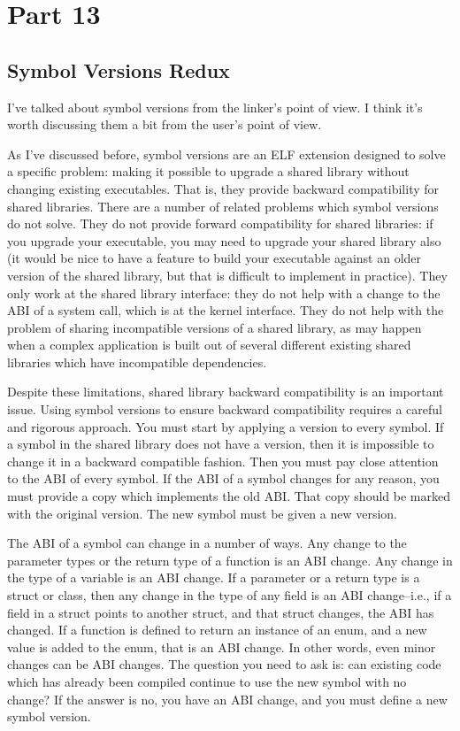 \section{Part 13}

\subsection{Symbol Versions Redux}

I've talked about symbol versions from the linker's point of view. I think it's
worth discussing them a bit from the user's point of view.

As I've discussed before, symbol versions are an ELF extension designed to
solve a specific problem: making it possible to upgrade a shared library
without changing existing executables. That is, they provide backward
compatibility for shared libraries. There are a number of related problems
which symbol versions do not solve. They do not provide forward compatibility
for shared libraries: if you upgrade your executable, you may need to upgrade
your shared library also (it would be nice to have a feature to build your
executable against an older version of the shared library, but that is
difficult to implement in practice). They only work at the shared library
interface: they do not help with a change to the ABI of a system call, which
is at the kernel interface. They do not help with the problem of sharing
incompatible versions of a shared library, as may happen when a complex
application is built out of several different existing shared libraries which
have incompatible dependencies.

Despite these limitations, shared library backward compatibility is an
important issue. Using symbol versions to ensure backward compatibility
requires a careful and rigorous approach. You must start by applying a version
to every symbol. If a symbol in the shared library does not have a version,
then it is impossible to change it in a backward compatible fashion. Then you
must pay close attention to the ABI of every symbol. If the ABI of a symbol
changes for any reason, you must provide a copy which implements the old ABI.
That copy should be marked with the original version. The new symbol must be
given a new version.

The ABI of a symbol can change in a number of ways. Any change to the parameter
types or the return type of a function is an ABI change. Any change in the type
of a variable is an ABI change. If a parameter or a return type is a struct or
class, then any change in the type of any field is an ABI change--i.e., if a
field in a struct points to another struct, and that struct changes, the ABI
has changed. If a function is defined to return an instance of an enum, and a
new value is added to the enum, that is an ABI change. In other words, even
minor changes can be ABI changes. The question you need to ask is: can existing
code which has already been compiled continue to use the new symbol with no
change? If the answer is no, you have an ABI change, and you must define a new
symbol version.

